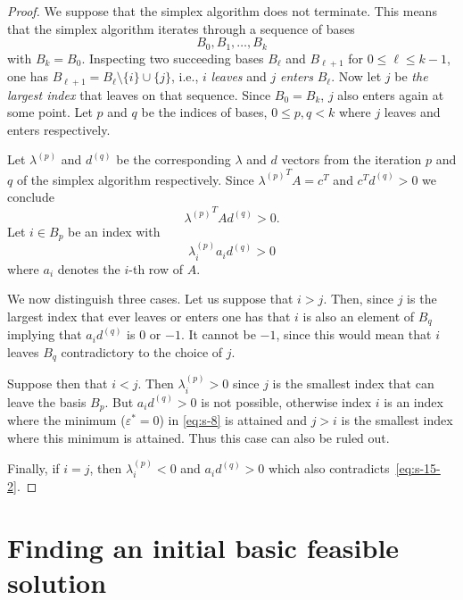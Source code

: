   \begin{proof}
    We suppose that the simplex algorithm does not terminate. This means that the simplex algorithm iterates through a sequence of bases 
    \begin{displaymath}
      B_0,B_1,\dots,B_k
    \end{displaymath}
    with $B_k = B_0$. Inspecting two succeeding bases $B_\ell$ and
    $B_{\ell+1}$ for $0\leq \ell \leq k-1$, one has $B_{\ell+1}
    =B_{\ell} \setminus \{i\} \cup \{j\}$, i.e., $i$ \emph{leaves}
    and $j$ \emph{enters} $B_{\ell}$. Now let $j$ be \emph{the largest
      index} that leaves on that sequence. Since $B_0 = B_k$, $j$ also
    enters again at some point. Let $p$ and $q$ be the indices of
    bases, $0 \leq p,q <k$ where $j$ leaves and enters respectively. 

    Let $\lambda^{(p)}$ and $d^{(q)}$ be the corresponding $\lambda$ and $d$
    vectors from the iteration $p$ and $q$ of the simplex algorithm
    respectively. Since ${\lambda^{(p)}}^T A = c^T$ and $c^T d^{(q)}>0$ we conclude 
    \begin{equation}
      \label{eq:s15-1}
      {\lambda^{(p)}}^T A d^{(q)} >0.
    \end{equation}
    Let $i \in B_p$ be an index with 
    \begin{equation}
      \label{eq:s-15-2}
      \lambda^{(p)}_i a_i d^{(q)} >0
    \end{equation}
    where $a_i$ denotes the $i$-th row of $A$. 


    We now distinguish three cases. Let us suppose that $i>j$. Then,
    since $j$ is the largest index that ever leaves or enters one has
    that $i$ is also an element of $B_q$ implying that $ a_i d^{(q)}$
    is $0$ or $-1$. It cannot be $-1$, since this would mean that $i$
    leaves $B_q$ contradictory to the choice of $j$.

    Suppose then that $i<j$. Then $\lambda_i^{(p)}>0$ since $j$ is the
    smallest index that can leave the basis $B_p$. But $a_id^{(q)} >0$
    is not possible, otherwise index $i$ is an index where the minimum
    ($\varepsilon^* = 0$) in \eqref{eq:s-8} is attained and $j>i$ is
    the smallest index where this minimum is attained. Thus this case
    can also be ruled out.

    Finally, if $i=j$, then $\lambda_i^{(p)} <0$ and $a_i d^{(q)}>0$
    which also contradicts~\eqref{eq:s-15-2}.
  \end{proof}


\section{Finding an initial basic feasible solution}
\label{sec:finding-an-initial}

